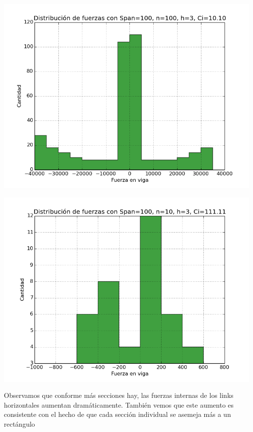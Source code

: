 \begin{center}
\includegraphics[scale=0.8]{archivos/graficos/hist_n100_C1000.png}\\
\end{center}

\begin{center}
\includegraphics[scale=0.8]{archivos/graficos/hist_n10_C1000.png}\\
\end{center}

Observamos que conforme más secciones hay, las fuerzas internas de los links horizontales aumentan dramáticamente. También vemos que este aumento es consistente con el hecho de que cada sección individual se asemeja más a un rectángulo\\


